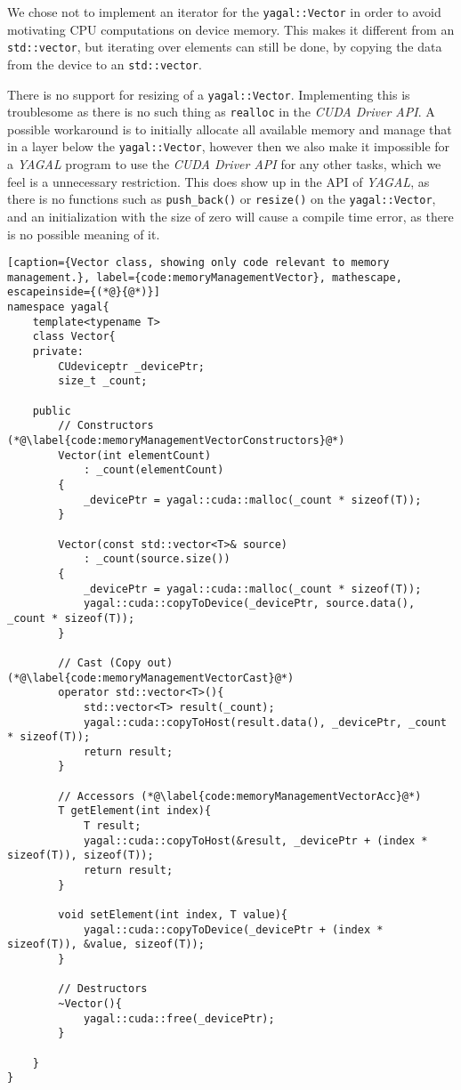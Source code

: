 We chose not to implement an iterator for the \texttt{yagal::Vector} in order to avoid motivating CPU computations on device memory. This makes it different from an \texttt{std::vector}, but iterating over elements can still be done, by copying the data from the device to an \texttt{std::vector}.

There is no support for resizing of a \texttt{yagal::Vector}. Implementing this is troublesome as there is no such thing as \texttt{realloc} in the \textit{CUDA Driver API}. A possible workaround is to initially allocate all available memory and manage that in a layer below the \texttt{yagal::Vector}, however then we also make it impossible for a \textit{YAGAL} program to use the \textit{CUDA Driver API} for any other tasks, which we feel is a unnecessary restriction. This does show up in the API of \textit{YAGAL}, as there is no functions such as \texttt{push\_back()} or \texttt{resize()} on the \texttt{yagal::Vector}, and an initialization with the size of zero will cause a compile time error, as there is no possible meaning of it.

\begin{lstlisting}[caption={Vector class, showing only code relevant to memory management.}, label={code:memoryManagementVector}, mathescape, escapeinside={(*@}{@*)}]
namespace yagal{
    template<typename T>
    class Vector{
    private:
        CUdeviceptr _devicePtr;
        size_t _count;

    public
        // Constructors (*@\label{code:memoryManagementVectorConstructors}@*)
        Vector(int elementCount)
            : _count(elementCount)
        {
            _devicePtr = yagal::cuda::malloc(_count * sizeof(T));
        }

        Vector(const std::vector<T>& source)
            : _count(source.size())
        {
            _devicePtr = yagal::cuda::malloc(_count * sizeof(T));
            yagal::cuda::copyToDevice(_devicePtr, source.data(), _count * sizeof(T));
        }

        // Cast (Copy out) (*@\label{code:memoryManagementVectorCast}@*)
        operator std::vector<T>(){
            std::vector<T> result(_count);
            yagal::cuda::copyToHost(result.data(), _devicePtr, _count * sizeof(T));
            return result;
        }

        // Accessors (*@\label{code:memoryManagementVectorAcc}@*)
        T getElement(int index){
            T result;
            yagal::cuda::copyToHost(&result, _devicePtr + (index * sizeof(T)), sizeof(T));
            return result;
        }

        void setElement(int index, T value){
            yagal::cuda::copyToDevice(_devicePtr + (index * sizeof(T)), &value, sizeof(T));
        }

        // Destructors
        ~Vector(){
            yagal::cuda::free(_devicePtr);
        }

    }
}
\end{lstlisting}